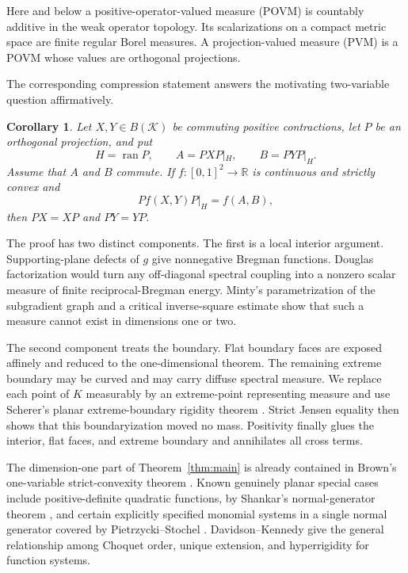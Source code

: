 \documentclass[11pt,a4paper]{amsart}
\newtheorem{corollary}[theorem]{Corollary}
\theoremstyle{remark}
\newcommand{\ran}{\operatorname{ran}}
\newcommand{\calK}{\mathcal K}
\begin{document}
Here and below a positive-operator-valued measure (POVM) is countably
additive in the weak operator topology.  Its scalarizations on a compact
metric space are finite regular Borel measures.  A projection-valued measure
(PVM) is a POVM whose values are orthogonal projections.

The corresponding compression statement answers the motivating
two-variable question affirmatively.

\begin{corollary}\label{cor:square}
Let \(X,Y\in B(\calK)\) be commuting positive contractions, let \(P\) be an
orthogonal projection, and put
\[
 H=\ran P,\qquad A=PXP|_H,\qquad B=PYP|_H.
\]
Assume that \(A\) and \(B\) commute.  If
\(f\colon[0,1]^2\to\mathbb R\) is continuous and strictly convex and
\[
   P f(X,Y)P|_H=f(A,B),
\]
then \(PX=XP\) and \(PY=YP\).
\end{corollary}

The proof has two distinct components.  The first is a local interior
argument.  Supporting-plane defects of \(g\) give nonnegative Bregman
functions.  Douglas factorization would turn any off-diagonal spectral
coupling into a nonzero scalar measure of finite reciprocal-Bregman energy.
Minty's parametrization of the subgradient graph and a critical
inverse-square estimate show that such a measure cannot exist in dimensions
one or two.

The second component treats the boundary.  Flat boundary faces are exposed
affinely and reduced to the one-dimensional theorem.  The remaining extreme
boundary may be curved and may carry diffuse spectral measure.  We replace
each point of \(K\) measurably by an extreme-point representing measure and
use Scherer's planar extreme-boundary rigidity theorem
\cite{SchererPlanar}.  Strict Jensen equality then shows that this
boundaryization moved no mass.  Positivity finally glues the interior, flat
faces, and extreme boundary and annihilates all cross terms.

The dimension-one part of Theorem~\ref{thm:main} is already contained in
Brown's one-variable strict-convexity theorem \cite{BrownConvergence}.
Known genuinely planar special cases include positive-definite quadratic
functions, by Shankar's normal-generator theorem \cite{Shankar}, and certain
explicitly specified monomial systems in a single normal generator covered
by Pietrzycki--Stochel \cite{PietrzyckiStochel}.  Davidson--Kennedy
\cite{DavidsonKennedy} give the general relationship among Choquet order,
unique extension, and hyperrigidity for function systems.
\end{document}
